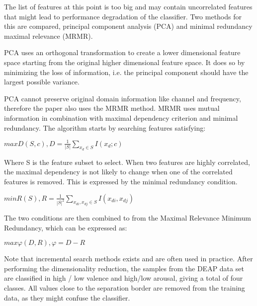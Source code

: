 \npar

The list of features at this point is too big and may contain uncorrelated features that might lead to performance degradation of the classifier. Two methods for this are compared, principal component analysis (PCA) and minimal redundancy maximal relevance (MRMR). 

\npar

PCA uses an orthogonal transformation to create a lower dimensional feature space starting from the original higher dimensional feature space. It does so by minimizing the loss of information, i.e. the principal component should have the largest possible variance. 

\npar

PCA cannot preserve original domain information like channel and frequency, therefore the paper also uses the MRMR method. MRMR uses mutual information in combination with maximal dependency criterion and minimal redundancy. The algorithm starts by searching features satisfying:

\begin{center}
$max D(S,c), D=\frac{1}{|S|} {\displaystyle \sum_{x_d \in S}} I(x_d;c)$
\end{center}

Where S is the feature subset to select. When two features are highly correlated, the maximal dependency is not likely to change when one of the correlated features is removed. This is expressed by the minimal redundancy condition.

\begin{center}
$min R(S), R = \frac{1}{|S|^2} {\displaystyle \sum_{x_{di}, x_{dj} \in S}} I(x_{di},x_{dj})$
\end{center}

The two conditions are then combined to from the Maximal Relevance Minimum Redundancy, which can be expressed as:

\begin{center}
$max \varphi(D,R), \varphi=D-R$
\end{center}
Note that incremental search methods exists and are often used in practice. After performing the dimensionality reduction, the samples from the DEAP data set are classified in high / low valence and high/low arousal, giving a total of four classes. All values close to the separation border are removed from the training data, as they might confuse the classifier. 

\npar 

